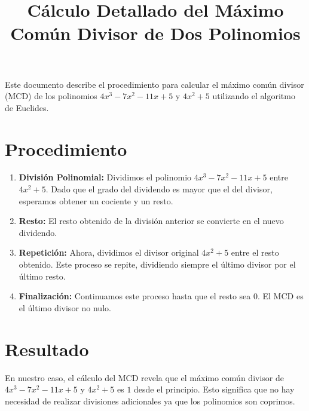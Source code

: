 \documentclass{article}
\begin{document}
\title{Cálculo Detallado del Máximo Común Divisor de Dos Polinomios}
\author{}
\date{}
\maketitle

Este documento describe el procedimiento para calcular el máximo común divisor (MCD) de los polinomios \( 4x^3 - 7x^2 - 11x + 5 \) y \( 4x^2 + 5 \) utilizando el algoritmo de Euclides.

\section*{Procedimiento}

\begin{enumerate}
    \item \textbf{División Polinomial:} Dividimos el polinomio \( 4x^3 - 7x^2 - 11x + 5 \) entre \( 4x^2 + 5 \). Dado que el grado del dividendo es mayor que el del divisor, esperamos obtener un cociente y un resto.
    \item \textbf{Resto:} El resto obtenido de la división anterior se convierte en el nuevo dividendo.
    \item \textbf{Repetición:} Ahora, dividimos el divisor original \( 4x^2 + 5 \) entre el resto obtenido. Este proceso se repite, dividiendo siempre el último divisor por el último resto.
    \item \textbf{Finalización:} Continuamos este proceso hasta que el resto sea 0. El MCD es el último divisor no nulo.
\end{enumerate}

\section*{Resultado}

En nuestro caso, el cálculo del MCD revela que el máximo común divisor de \( 4x^3 - 7x^2 - 11x + 5 \) y \( 4x^2 + 5 \) es \( 1 \) desde el principio. Esto significa que no hay necesidad de realizar divisiones adicionales ya que los polinomios son coprimos.
\end{document}
